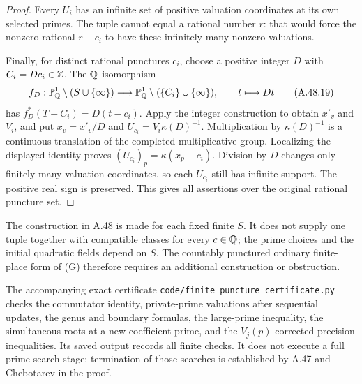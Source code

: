 \begin{proof}
Every $U_i$ has an infinite set of positive
valuation coordinates at its own selected
primes. The tuple cannot equal a rational
number $r$: that would force the nonzero
rational $r-c_i$ to have these infinitely
many nonzero valuations.

Finally, for distinct rational punctures
$c_i$, choose a positive integer $D$ with
$C_i=Dc_i\in\mathbb Z$. The $\mathbb Q$-isomorphism
\[
 f_D:\mathbb P^1_\mathbb Q\setminus(S\cup\{\infty\})
       \longrightarrow
       \mathbb P^1_\mathbb Q\setminus(\{C_i\}\cup\{\infty\}),
       \qquad t\longmapsto Dt
 \tag{A.48.19}
\]
has $f_D^*(T-C_i)=D(t-c_i)$. Apply the integer
construction to obtain $x'_v$ and $V_i$, and put
$x_v=x'_v/D$ and $U_{c_i}=V_i\kappa(D)^{-1}$.
Multiplication by $\kappa(D)^{-1}$ is a continuous
translation of the completed multiplicative group.
Localizing the displayed identity proves
$ (U_{c_i})_p=\kappa(x_p-c_i)$.
Division by $D$ changes only finitely many
valuation coordinates, so each $U_{c_i}$ still
has infinite support. The positive real sign
is preserved. This gives all assertions over
the original rational puncture set.
\end{proof}

The construction in A.48 is made for each fixed
finite $S$. It does not supply one tuple together
with compatible classes for every $c\in\mathbb Q$;
the prime choices and the initial quadratic
fields depend on $S$. The countably punctured
ordinary finite-place form of (G) therefore
requires an additional construction or obstruction.

The accompanying exact certificate
\texttt{code/finite\_puncture\_certificate.py}
checks the commutator identity, private-prime
valuations after sequential updates, the genus
and boundary formulas, the large-prime inequality,
the simultaneous roots at a new coefficient prime,
and the $V_j(p)$-corrected precision inequalities.
Its saved output records all finite checks.
It does not execute a full prime-search stage;
termination of those searches is established
by A.47 and Chebotarev in the proof.
